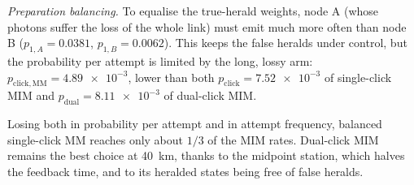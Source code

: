 \emph{Preparation balancing.} To equalise the true-herald weights, node A (whose photons suffer the
loss of the whole link) must emit much more often than node B ($p_{1,A}=0.0381$, $p_{1,B}=0.0062$).
This keeps the false heralds under control, but the probability per attempt is limited by the long,
lossy arm: $p_\mathrm{click,MM} = \num{4.89e-3}$, lower than both $p_\mathrm{click}=\num{7.52e-3}$ of
single-click MIM and $p_\mathrm{dual} = \num{8.11e-3}$ of dual-click MIM.

Losing both in probability per attempt and in attempt frequency, balanced single-click MM reaches only
about $1/3$ of the MIM rates. Dual-click MIM remains the best choice at \SI{40}{\kilo\metre}, thanks to
the midpoint station, which halves the feedback time, and to its heralded states being free of false heralds.
